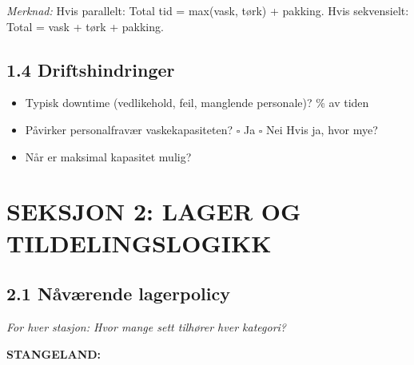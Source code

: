 \documentclass[12pt, a4paper, norsk]{article}
\begin{document}
\vspace{0.3cm}

\noindent
\textit{Merknad:} Hvis parallelt: Total tid = max(vask, tørk) + pakking. Hvis sekvensielt: Total = vask + tørk + pakking.

\vspace{0.5cm}

\subsection*{1.4 Driftshindringer}

\vspace{0.3cm}

\begin{itemize}
\item[\textbf{Q:}] Typisk downtime (vedlikehold, feil, manglende personale)? 
  \newline\underline{\hspace{8cm}} \% av tiden

\item[\textbf{Q:}] Påvirker personalfravær vaskekapasiteten? 
  \newline $\square$ Ja $\square$ Nei \quad Hvis ja, hvor mye? \underline{\hspace{4cm}}

\item[\textbf{Q:}] Når er maksimal kapasitet mulig? 
  \newline\underline{\hspace{12cm}}
\end{itemize}

\newpage

\section*{SEKSJON 2: LAGER OG TILDELINGSLOGIKK}

\subsection*{2.1 Nåværende lagerpolicy}

\noindent
\textit{For hver stasjon: Hvor mange sett tilhører hver kategori?}

\vspace{0.5cm}

\noindent
\textbf{STANGELAND:}
\end{document}
